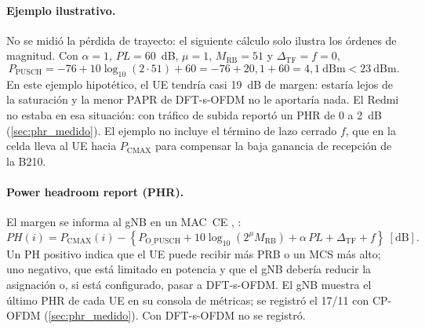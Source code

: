 \paragraph{Ejemplo ilustrativo.} No se midió la pérdida de trayecto: el siguiente cálculo solo ilustra los órdenes de magnitud. Con $\alpha=1$, $PL = 60$~dB, $\mu=1$, $M_\text{RB}=51$ y $\Delta_\text{TF}=f=0$,
\begin{equation}
P_\text{PUSCH} = -76 + 10\log_{10}(2\cdot 51) + 60 = -76 + 20{,}1 + 60 = 4{,}1~\text{dBm} < 23~\text{dBm}.
\end{equation}
En este ejemplo hipotético, el UE tendría casi 19~dB de margen: estaría lejos de la saturación y la menor PAPR de DFT-s-OFDM no le aportaría nada. El Redmi no estaba en esa situación: con tráfico de subida reportó un PHR de 0 a 2~dB (\cref{sec:phr_medido}). El ejemplo no incluye el término de lazo cerrado $f$, que en la celda lleva al UE hacia $P_\text{CMAX}$ para compensar la baja ganancia de recepción de la B210.

\paragraph{Power headroom report (PHR).} El margen se informa al gNB en un MAC~CE \cite[§5.4.6]{ts38321}, \cite[§7.7]{ts38213}:
\begin{equation}
PH(i) = P_\text{CMAX}(i) - \left\{P_\text{O\_PUSCH} + 10\log_{10}(2^\mu M_\text{RB}) + \alpha\,PL + \Delta_\text{TF} + f\right\}~[\text{dB}].
\label{eq:phr}
\end{equation}
Un PH positivo indica que el UE puede recibir más PRB o un MCS más alto; uno negativo, que está limitado en potencia y que el gNB debería reducir la asignación o, si está configurado, pasar a DFT-s-OFDM. El gNB muestra el último PHR de cada UE en su consola de métricas; se registró el 17/11 con CP-OFDM (\cref{sec:phr_medido}). Con DFT-s-OFDM no se registró.
